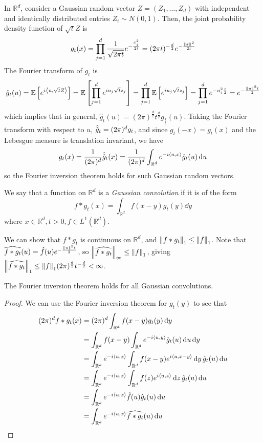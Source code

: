 In \( \mathbb R^d \), consider a Gaussian random vector \( Z = (Z_1, \dots, Z_d) \) with independent and identically distributed entries \( Z_i \sim N(0,1) \).
Then, the joint probability density function of \( \sqrt{t}Z \) is
\[ g_t(x) = \prod_{j=1}^d \frac{1}{\sqrt{2\pi t}} e^{-\frac{x_j^2}{2t}} = (2\pi t)^{-\frac{d}{2}} e^{-\frac{\norm{x}^2}{2t}} \]
The Fourier transform of \( g_t \) is
\[ \hat g_t(u) = \mathbb{E}\left[{e^{i\left\langle{u,\sqrt{t}Z}\right\rangle}}\right] = \mathbb{E}\left[{\prod_{j=1}^d e^{iu_j \sqrt{t} z_j}}\right] = \prod_{j=1}^d \mathbb{E}\left[{e^{iu_j \sqrt{t} z_j}}\right] = \prod_{j=1}^d e^{-u_j^2 \frac{t}{2}} = e^{-\frac{\norm{u}^2 t}{2}} \]
which implies that in general, \( \hat g_t(u) = (2\pi)^{\frac{d}{2}} t^{\frac{d}{2}} g_{\frac{1}{t}}(u) \).
Taking the Fourier transform with respect to \( u \), \( \hat{\hat{g}}_t = (2\pi)^d g_t \), and since \( g_t(-x) = g_t(x) \) and the Lebesgue measure is translation invariant, we have
\[ g_t(x) = \frac{1}{(2\pi)^d} \hat{\hat{g}}_t(x) = \frac{1}{(2\pi)^d} \int_{\mathbb R^d} e^{-i\left\langle{u,x}\right\rangle} \hat g_t(u) \dd{u} \]
so the Fourier inversion theorem holds for such Gaussian random vectors.
\begin{definition}
	We say that a function on \( \mathbb R^d \) is a \emph{Gaussian convolution} if it is of the form
	\[ f \ast g_t(x) = \int_{\mathbb R^d} f(x-y) g_t(y) \dd{y} \]
	where \( x \in \mathbb R^d, t > 0, f \in L^1(\mathbb R^d) \).
\end{definition}
We can show that \( f \ast g_t \) is continuous on \( \mathbb R^d \), and \( \norm{f \ast g_t}_1 \leq \norm{f}_1 \).
Note that \( \widehat{f \ast g_t}(u) = \hat f(u) e^{-\frac{\norm{u}^2 t}{2}} \), so \( \norm{\widehat{f \ast g_t}}_\infty \leq \norm{f}_1 \), giving \( \norm{\widehat{f \ast g_t}}_1 \leq \norm{f}_1 (2\pi)^{\frac{d}{2}} t^{-\frac{d}{2}} < \infty \).
\begin{lemma}
	The Fourier inversion theorem holds for all Gaussian convolutions.
\end{lemma}
\begin{proof}
	We can use the Fourier inversion theorem for \( g_t(y) \) to see that
	\begin{align*}
		(2\pi)^d f \ast g_t(x) &= (2\pi)^d \int_{\mathbb R^d} f(x-y) g_t(y) \dd{y} \\
		&= \int_{\mathbb R^d} f(x-y) \int_{\mathbb R^d} e^{-i\left\langle{u,y}\right\rangle} \hat g_t(u) \dd{u} \dd{y} \\
		&= \int_{\mathbb R^d} e^{-i\left\langle{u,x}\right\rangle} \int_{\mathbb R^d} f(x-y) e^{i\left\langle{u,x-y}\right\rangle} \dd{y} \hat g_t(u) \dd{u} \\
		&= \int_{\mathbb R^d} e^{-i\left\langle{u,x}\right\rangle} \int_{\mathbb R^d} f(z) e^{i\left\langle{u,z}\right\rangle} \dd{z} \hat g_t(u) \dd{u} \\
		&= \int_{\mathbb R^d} e^{-i\left\langle{u,x}\right\rangle} \hat f(u) \hat g_t(u) \dd{u} \\
		&= \int_{\mathbb R^d} e^{-i\left\langle{u,x}\right\rangle} \widehat{f \ast g_t}(u) \dd{u}
	\end{align*}
\end{proof}

